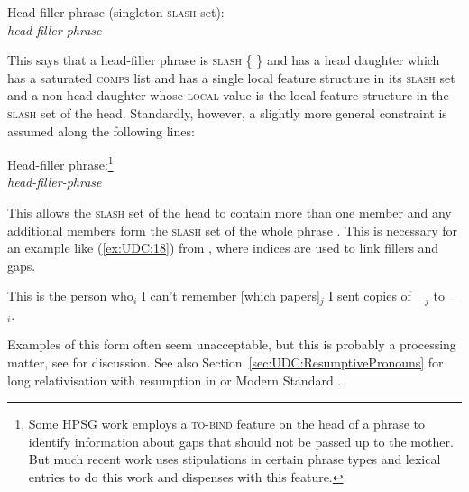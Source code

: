 \documentclass[output=paper
,notxmath 
 	        ,biblatex
                ,babelshorthands
                ,newtxmath
                ,draftmode
                ,colorlinks, citecolor=brown
]{langscibook}
\begin{document}
\ea
Head-filler phrase (singleton \textsc{slash} set):\\
\emph{head-filler-phrase} \impl\\
\z

\noindent
This says that a head-filler phrase is \textsc{slash} \{  \} and has a head
daughter which has a saturated \textsc{comps} list and has a single local feature structure in its
\textsc{slash} set and a non-head daughter whose \textsc{local} value is the local feature
structure in the \textsc{slash} set of the head. Standardly, however, a slightly
more general constraint is assumed along the following lines:

\eas
\label{fig:UDC:17}%
Head-filler phrase:\footnote{Some HPSG work employs a \textsc{to-bind} feature
  on the head of a phrase to identify information about gaps that
  should not be passed up to the mother. But much recent work uses
  stipulations in certain phrase types and lexical entries to do this
  work and dispenses with this feature.

}\\
\emph{head-filler-phrase} \impl\\
\zs

\noindent
This allows the \textsc{slash} set of the head to contain more than one member
and any additional members form the \textsc{slash} set of the whole phrase . This
is necessary for an example like (\ref{ex:UDC:18}) from \citet[473]{Chaves:12}, where indices
are used to link fillers and gaps.

\ea
\label{ex:UDC:18}
This is the person who$_i$ I can't remember [which papers]$_j$ I sent copies of \_$_j$ to \_$_i$.
\z

\noindent
Examples of this form often seem unacceptable, but this is probably a
processing matter, see \citet[Section~3]{Chaves:12} for discussion.
See also Section~\ref{sec:UDC:ResumptivePronouns} for long
relativisation with resumption in  or Modern Standard .
\end{document}
